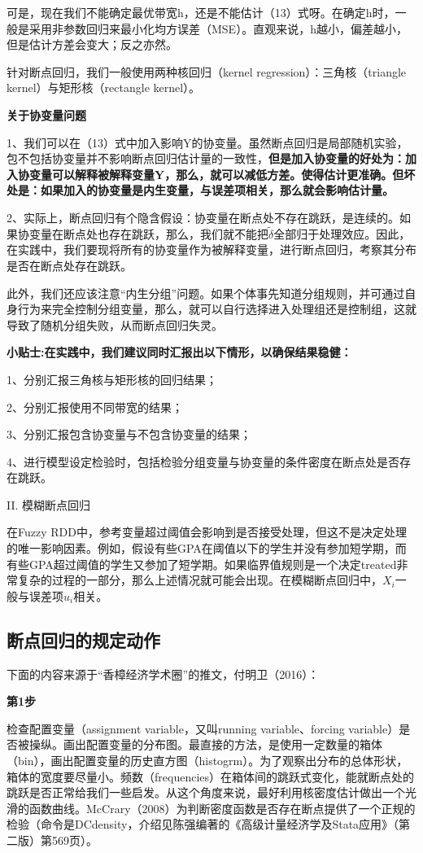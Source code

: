 \documentclass[cn,12pt,math=newtx,citestyle=gb7714-2015,bibstyle=gb7714-2015]{elegantbook}
\begin{document}
	可是，现在我们不能确定最优带宽h，还是不能估计（13）式呀。在确定h时，一般是采用非参数回归来最小化均方误差（MSE）。直观来说，h越小，偏差越小，但是估计方差会变大；反之亦然。
	
	针对断点回归，我们一般使用两种核回归（kernel regression）：三角核（triangle kernel）与矩形核（rectangle kernel）。
	
	\textbf{关于协变量问题}
	
	1、我们可以在（13）式中加入影响Y的协变量。虽然断点回归是局部随机实验，包不包括协变量并不影响断点回归估计量的一致性，\textbf{但是加入协变量的好处为：加入协变量可以解释被解释变量Y，那么，就可以减低方差。使得估计更准确。但坏处是：如果加入的协变量是内生变量，与误差项相关，那么就会影响估计量。}
	
	2、实际上，断点回归有个隐含假设：协变量在断点处不存在跳跃，是连续的。如果协变量在断点处也存在跳跃，那么，我们就不能把$\tilde{\delta}$全部归于处理效应。因此，在实践中，我们要现将所有的协变量作为被解释变量，进行断点回归，考察其分布是否在断点处存在跳跃。
	
	此外，我们还应该注意“内生分组”问题。如果个体事先知道分组规则，并可通过自身行为来完全控制分组变量，那么，就可以自行选择进入处理组还是控制组，这就导致了随机分组失败，从而断点回归失灵。
	
	\textbf{小贴士:在实践中，我们建议同时汇报出以下情形，以确保结果稳健：}
	
	1、分别汇报三角核与矩形核的回归结果；
	
	2、分别汇报使用不同带宽的结果；
	
	3、分别汇报包含协变量与不包含协变量的结果；
	
	4、进行模型设定检验时，包括检验分组变量与协变量的条件密度在断点处是否存在跳跃。
	
	
	II. 模糊断点回归
	
	在Fuzzy RDD中，参考变量超过阈值会影响到是否接受处理，但这不是决定处理的唯一影响因素。例如，假设有些GPA在阈值以下的学生并没有参加短学期，而有些GPA超过阈值的学生又参加了短学期。如果临界值规则是一个决定treated非常复杂的过程的一部分，那么上述情况就可能会出现。在模糊断点回归中，$X_i$一般与误差项$u_i$相关。
	
	\subsection{断点回归的规定动作}
	
	下面的内容来源于“香樟经济学术圈”的推文，付明卫（2016）：
	
	\textbf{第1步}
	
	检查配置变量（assignment variable，又叫running variable、forcing variable）是否被操纵。画出配置变量的分布图。最直接的方法，是使用一定数量的箱体（bin），画出配置变量的历史直方图（histogrm）。为了观察出分布的总体形状，箱体的宽度要尽量小。频数（frequencies）在箱体间的跳跃式变化，能就断点处的跳跃是否正常给我们一些启发。从这个角度来说，最好利用核密度估计做出一个光滑的函数曲线。McCrary（2008）为判断密度函数是否存在断点提供了一个正规的检验（命令是DCdensity，介绍见陈强编著的《高级计量经济学及Stata应用》（第二版）第569页）。
	
\end{document}
